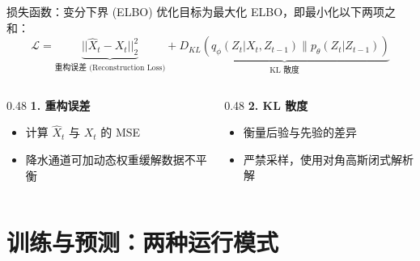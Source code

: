 \documentclass[10pt,aspectratio=1610]{beamer}
\begin{document}

\begin{frame}{损失函数：变分下界 (ELBO)}
    优化目标为最大化 ELBO，即最小化以下两项之和：
    \begin{equation}
        \mathcal{L} = \underbrace{|| \hat{X}_t - X_t ||_{2}^{2}}_{\text{重构误差 (Reconstruction Loss)}} + \underbrace{D_{KL}(q_\phi(Z_t|X_{t},Z_{t-1}) \| p_\theta(Z_t|Z_{t-1}))}_{\text{KL 散度}}
    \end{equation}
    \vspace{0.3cm}
    \begin{columns}
        \begin{column}{0.48\textwidth}
            \textbf{1. 重构误差}
            \begin{itemize}
                \item 计算 $\hat{X}_t$ 与 $X_t$ 的 MSE
                \item 降水通道可加动态权重缓解数据不平衡
            \end{itemize}
        \end{column}
        \begin{column}{0.48\textwidth}
            \textbf{2. KL 散度}
            \begin{itemize}
                \item 衡量后验与先验的差异
                \item \alert{严禁采样}，使用对角高斯闭式解析解
            \end{itemize}
        \end{column}
    \end{columns}
\end{frame}

\section{训练与预测：两种运行模式}
\end{document}

